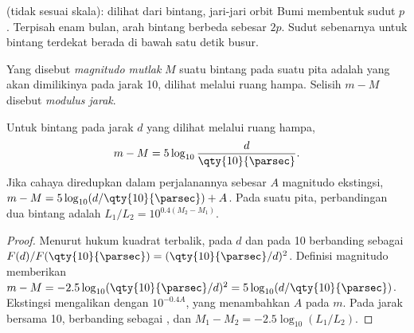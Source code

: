 \begin{omfigure}

{\small {} (tidak sesuai skala): dilihat dari bintang, jari-jari orbit Bumi membentuk sudut $p$. Terpisah enam bulan, arah bintang berbeda sebesar $2p$. Sudut sebenarnya untuk bintang terdekat berada di bawah satu detik busur.}
\end{omfigure}

\begin{definition}\label{def:b1:observing-the-sky:absolute}
Yang disebut \emph{magnitudo mutlak} $M$ suatu bintang pada suatu pita adalah  yang akan dimilikinya pada jarak
\qty{10}{\parsec}, dilihat melalui ruang hampa. Selisih $m - M$ disebut \emph{modulus jarak}.
\end{definition}

\begin{proposition}\label{prop:b1:observing-the-sky:modulus}
Untuk bintang pada jarak $d$ yang dilihat melalui ruang hampa,
\[
  m - M = 5\log_{10}\frac{d}{\qty{10}{\parsec}} .
\]
Jika cahaya diredupkan dalam perjalanannya sebesar $A$ magnitudo ekstingsi, $m - M = 5\log_{10}(d/\qty{10}{\parsec}) + A$. Pada suatu pita, perbandingan  dua bintang adalah $L_1/L_2 = 10^{0.4(M_2 - M_1)}$.
\end{proposition}

\begin{proof}
Menurut hukum kuadrat terbalik,  pada $d$ dan  pada \qty{10}{\parsec} berbanding sebagai $F(d)/F(\qty{10}{\parsec}) = (\qty{10}{\parsec}/d)^2$. Definisi magnitudo memberikan $m - M = -2.5\log_{10}(\qty{10}{\parsec}/d)^2
= 5\log_{10}(d/\qty{10}{\parsec})$. Ekstingsi mengalikan  dengan
$10^{-0.4A}$, yang menambahkan $A$ pada $m$. Pada jarak bersama \qty{10}{\parsec},  berbanding sebagai , dan
$M_1 - M_2 = -2.5\log_{10}(L_1/L_2)$.
\end{proof}

